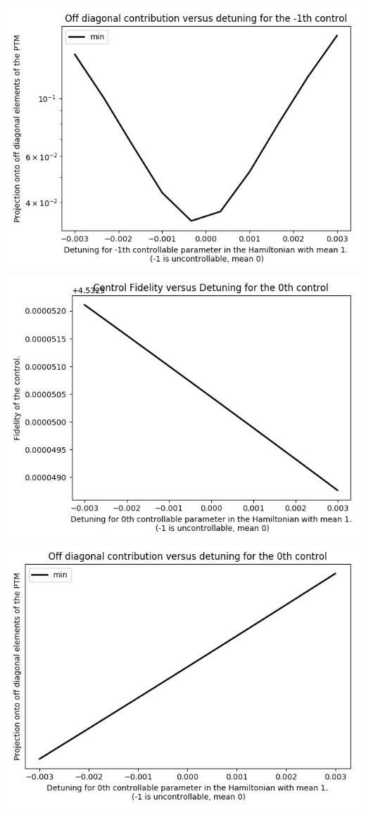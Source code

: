 \documentclass{article}
\begin{document}
\begin{center}
\includegraphics[scale=.9]{off_diag_0}
\includegraphics[scale=.9]{control_fid_1}
\includegraphics[scale=.9]{off_diag_1}

\end{center}
\end{document}
